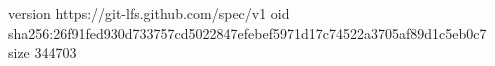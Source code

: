 version https://git-lfs.github.com/spec/v1
oid sha256:26f91fed930d733757cd5022847efebef5971d17c74522a3705af89d1c5eb0c7
size 344703

